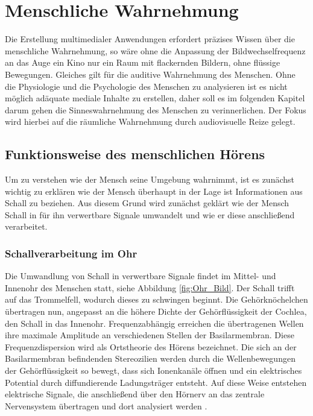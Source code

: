 \chapter{Menschliche Wahrnehmung}
Die Erstellung multimedialer Anwendungen erfordert präzises Wissen über die menschliche Wahrnehmung, so wäre ohne die Anpassung der Bildwechselfrequenz an das Auge ein Kino nur ein Raum mit flackernden Bildern, ohne flüssige Bewegungen. Gleiches gilt für die auditive Wahrnehmung des Menschen. Ohne die Physiologie und die Psychologie des Menschen zu analysieren ist es nicht möglich adäquate mediale Inhalte zu erstellen, daher soll es im folgenden Kapitel darum gehen die Sinneswahrnehmung des Menschen zu verinnerlichen. Der Fokus wird hierbei auf die räumliche Wahrnehmung durch audiovisuelle Reize gelegt. 

\section{Funktionsweise des menschlichen Hörens}
Um zu verstehen wie der Mensch seine Umgebung wahrnimmt, ist es zunächst wichtig zu erklären wie der Mensch überhaupt in der Lage ist Informationen aus Schall zu beziehen. Aus diesem Grund wird zunächst geklärt wie der Mensch Schall in für ihn verwertbare Signale umwandelt und wie er diese anschließend verarbeitet.

\subsection{Schallverarbeitung im Ohr}

Die Umwandlung von Schall in verwertbare Signale findet im Mittel- und Innenohr des Menschen statt, siehe Abbildung \ref{fig:Ohr_Bild}. Der Schall trifft auf das Trommelfell, wodurch dieses zu schwingen beginnt. Die Gehörknöchelchen übertragen nun, angepasst an die höhere Dichte der Gehörflüssigkeit der Cochlea, den Schall in das Innenohr. Frequenzabhängig erreichen die übertragenen Wellen ihre maximale Amplitude an verschiedenen Stellen der Basilarmembran. Diese Frequenzdispersion wird als Ortstheorie des Hörens bezeichnet. Die sich an der Basilarmembran befindenden Stereozilien werden durch die Wellenbewegungen der Gehörflüssigkeit so bewegt, dass sich Ionenkanäle öffnen und ein elektrisches Potential durch diffundierende Ladungsträger entsteht. Auf diese Weise entstehen elektrische Signale, die  anschließend über den Hörnerv an das zentrale Nervensystem übertragen und dort analysiert werden \cite[S.48]{HdA08}. 

